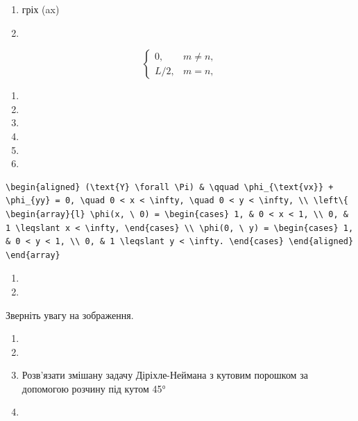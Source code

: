 \documentclass[
  ukrainian,
]{article}
\providecommand{\tightlist}{%
  \setlength{\itemsep}{0pt}\setlength{\parskip}{0pt}}
\begin{document}
\begin{enumerate}
\def\labelenumi{\arabic{enumi}.}
\setcounter{enumi}{19}
\item
  гріх (ax)
\item
\end{enumerate}

\[
\begin{cases} 0, & m \neq n, \\ L/2, & m = n, \end{cases}
\]

\begin{enumerate}
\def\labelenumi{\arabic{enumi}.}
\setcounter{enumi}{10}
\tightlist
\item
\item
\item
\item
\item
\item
\end{enumerate}

\begin{verbatim}
\begin{aligned} (\text{Y} \forall \Pi) & \qquad \phi_{\text{vx}} + \phi_{yy} = 0, \quad 0 < x < \infty, \quad 0 < y < \infty, \\ \left\{ \begin{array}{l} \phi(x, \ 0) = \begin{cases} 1, & 0 < x < 1, \\ 0, & 1 \leqslant x < \infty, \end{cases} \\ \phi(0, \ y) = \begin{cases} 1, & 0 < y < 1, \\ 0, & 1 \leqslant y < \infty. \end{cases} \end{aligned} \end{array}
\end{verbatim}

\begin{enumerate}
\def\labelenumi{\arabic{enumi}.}
\setcounter{enumi}{16}
\tightlist
\item
\item
\end{enumerate}

Зверніть увагу на зображення.

\begin{enumerate}
\def\labelenumi{\arabic{enumi}.}
\setcounter{enumi}{18}
\item
\item
\item
  Розв'язати змішану задачу Діріхле-Неймана з кутовим порошком за
  допомогою розчину під кутом 45°
\item
\end{enumerate}
\end{document}

